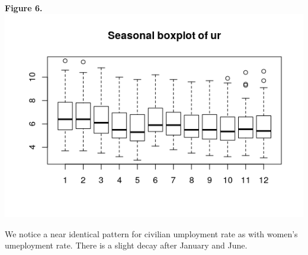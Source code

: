 \documentclass[11pt]{article}
\begin{document}
\begin{center}
\textbf{Figure 6.}
\\
\includegraphics[scale=1]{bp-ur}
\end{center}
We notice a near identical pattern for civilian umployment rate as with women's umeployment rate. There is a slight decay after January and June.
\end{document}
